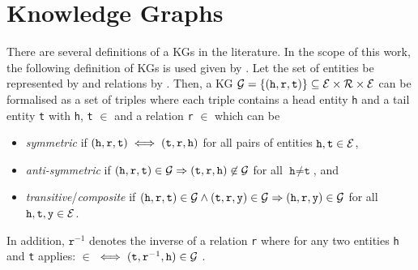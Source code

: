\section{Knowledge Graphs} 
\label{sec:knowledge_graphs}
%
There are several definitions of a \acp{KG} in the literature. 
In the scope of this work, the following definition of \acp{KG} is used given by \cite{ConEx, RotatE}.
Let the set of entities be represented by \entities and relations by \relations.
Then, a \ac{KG} $\mathcal{G}= \{(\texttt{h}, \texttt{r}, \texttt{t}) \}  \subseteq \mathcal{E} \times \mathcal{R} \times \mathcal{E}$ can be formalised as a set of triples where each triple contains a head entity \texttt{h} and a tail entity \texttt{t} with \texttt{h}, \texttt{t} $\in$ \entities and a relation \texttt{r} $\in$ \relations which can be \cite{ConEx}
\begin{itemize}
    \item 
    \emph{symmetric} if $(\texttt{h}, \texttt{r}, \texttt{t}) \iff (\texttt{t}, \texttt{r}, \texttt{h})$ for all pairs of entities $\texttt{h},\texttt{t}\in \mathcal{E}$, 
   
   \item 
   \emph{anti-symmetric} if $(\texttt{h}, \texttt{r}, \texttt{t}) \in \mathcal{G} \Rightarrow (\texttt{t}, \texttt{r}, \texttt{h}) \not \in \mathcal{G}$ for all $\texttt{h} \not= \texttt{t}$, and
    
    \item 
    \emph{transitive}/\emph{composite} if $(\texttt{h}, \texttt{r}, \texttt{t})\in\mathcal{G} \wedge (\texttt{t}, \texttt{r}, \texttt{y}) \in \mathcal{G}  \Rightarrow (\texttt{h}, \texttt{r}, \texttt{y}) \in \mathcal{G}$ for all $\texttt{h},\texttt{t},\texttt{y}\in \mathcal{E}$.
\end{itemize}
In addition, $\texttt{r}^{-1}$ denotes the inverse of a relation \texttt{r} where for any two entities \texttt{h} and \texttt{t} applies: 
 $\in$ \kg $\iff (\texttt{t},\texttt{r}^{-1},\texttt{h}) \in \mathcal{G}$ \cite{ConEx}.